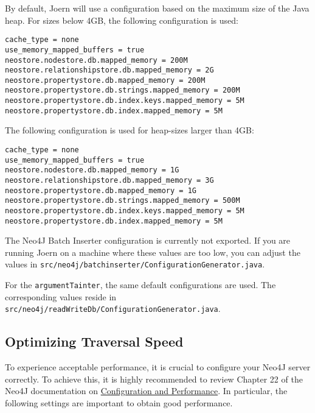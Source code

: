 \documentclass[a4paper]{article}
\newcommand{\code}[1]{\texttt{\small #1}}
\begin{document}
By default, Joern will use a configuration based on the maximum size
of the Java heap. For sizes below 4GB, the following configuration is
used:

\begin{verbatim}
cache_type = none
use_memory_mapped_buffers = true
neostore.nodestore.db.mapped_memory = 200M
neostore.relationshipstore.db.mapped_memory = 2G
neostore.propertystore.db.mapped_memory = 200M
neostore.propertystore.db.strings.mapped_memory = 200M
neostore.propertystore.db.index.keys.mapped_memory = 5M
neostore.propertystore.db.index.mapped_memory = 5M
\end{verbatim}

The following configuration is used for heap-sizes larger than 4GB:

\begin{verbatim}
cache_type = none
use_memory_mapped_buffers = true
neostore.nodestore.db.mapped_memory = 1G
neostore.relationshipstore.db.mapped_memory = 3G
neostore.propertystore.db.mapped_memory = 1G
neostore.propertystore.db.strings.mapped_memory = 500M
neostore.propertystore.db.index.keys.mapped_memory = 5M
neostore.propertystore.db.index.mapped_memory = 5M
\end{verbatim}

The Neo4J Batch Inserter configuration is currently not
exported. If you are running Joern on a machine where these values
are too low, you can adjust the values in
\code{src/neo4j/batchinserter/ConfigurationGenerator.java}.

For the \code{argumentTainter}, the same default configurations are
used. The corresponding values reside in
\code{src/neo4j/readWriteDb/ConfigurationGenerator.java}.

\subsection{Optimizing Traversal Speed}

To experience acceptable performance, it is crucial to configure your
Neo4J server correctly. To achieve this, it is highly recommended to
review Chapter 22 of the Neo4J documentation on
\href{http://docs.neo4j.org/chunked/stable/embedded-configuration.html}{Configuration
  and Performance}. In particular, the following settings are
important to obtain good performance.
\end{document}

